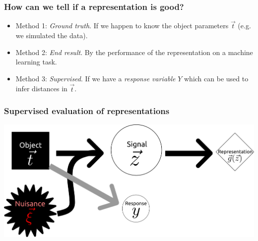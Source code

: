 \documentclass{beamer}
\begin{document}
\begin{frame}
\frametitle{How can we tell if a representation is good?}
\begin{itemize}
\item Method 1: \emph{Ground truth}. If we happen to know the object parameters $\vec{t}$ (e.g. we simulated the data). \pause
\item Method 2: \emph{End result}. By the performance of the representation on a machine learning task. \pause
\item Method 3: \emph{Supervised}.  If we have a \emph{response variable} $Y$ which can be used to infer distances in $\vec{t}$.
\end{itemize}
\end{frame}

\begin{frame}
\frametitle{Supervised evaluation of representations}
\begin{center}
\includegraphics[scale = 0.25]{defense_diagrams/supervised_eval.png}
\end{center}
\end{frame}
\end{document}
